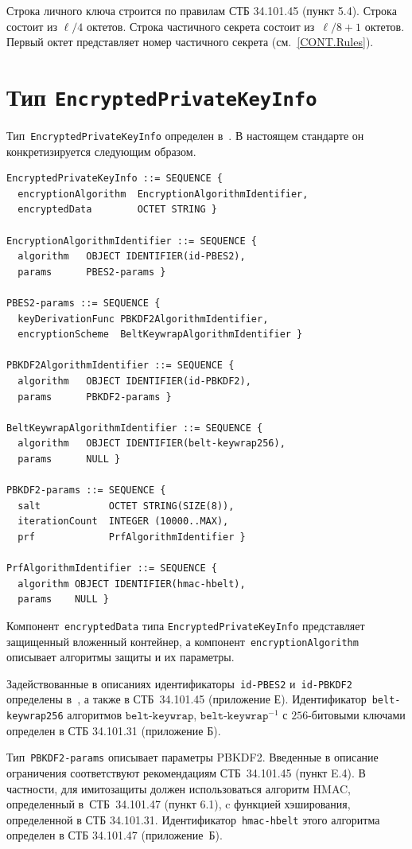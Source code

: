 Строка личного ключа строится по правилам СТБ 34.101.45 (пункт 5.4). 
Строка состоит из $\ell/4$ октетов. 
%
Строка частичного секрета состоит из~$\ell/8+1$ октетов. 
Первый октет представляет номер частичного секрета (см.~\ref{CONT.Rules}).

\section{Тип \texttt{EncryptedPrivateKeyInfo}}\label{CONT.CT}

Тип~\texttt{EncryptedPrivateKeyInfo} определен в~\cite{PKCS5}. В настоящем
стандарте он конкретизируется следующим образом.
%
\begin{verbatim}
EncryptedPrivateKeyInfo ::= SEQUENCE {
  encryptionAlgorithm  EncryptionAlgorithmIdentifier,
  encryptedData        OCTET STRING }

EncryptionAlgorithmIdentifier ::= SEQUENCE {
  algorithm   OBJECT IDENTIFIER(id-PBES2),
  params      PBES2-params }

PBES2-params ::= SEQUENCE {
  keyDerivationFunc PBKDF2AlgorithmIdentifier,
  encryptionScheme  BeltKeywrapAlgorithmIdentifier }

PBKDF2AlgorithmIdentifier ::= SEQUENCE {
  algorithm   OBJECT IDENTIFIER(id-PBKDF2),
  params      PBKDF2-params }

BeltKeywrapAlgorithmIdentifier ::= SEQUENCE {
  algorithm   OBJECT IDENTIFIER(belt-keywrap256),
  params      NULL }

PBKDF2-params ::= SEQUENCE {
  salt            OCTET STRING(SIZE(8)),
  iterationCount  INTEGER (10000..MAX),
  prf             PrfAlgorithmIdentifier }

PrfAlgorithmIdentifier ::= SEQUENCE {
  algorithm OBJECT IDENTIFIER(hmac-hbelt), 
  params    NULL }
\end{verbatim}

Компонент~\texttt{encryptedData} типа \texttt{EncryptedPrivateKeyInfo}
представляет защищенный вложенный контейнер, 
а компонент~\texttt{encryptionAlgorithm} описывает
алгоритмы защиты и их параметры. 

Задействованные в описаниях идентификаторы~\texttt{id-PBES2} 
и~\texttt{id-PBKDF2} определены в~\cite{PKCS5}, а также в СТБ~34.101.45 
(приложение Е).  
%
Идентификатор~\texttt{belt-keywrap256} алгоритмов 
$\texttt{belt-keywrap}$, $\texttt{belt-keywrap}^{-1}$
с $256$-битовыми ключами определен в СТБ 34.101.31 (приложение Б).

Тип~\texttt{PBKDF2-params} описывает параметры PBKDF2.
Введенные в описание ограничения соответствуют 
рекомендациям СТБ~34.101.45 (пункт E.4).
%
В частности, для имитозащиты должен использоваться алгоритм HMAC, 
определенный в~СТБ~34.101.47 (пункт 6.1), c функцией хэширования, 
определенной в СТБ 34.101.31. 
Идентификатор~\texttt{hmac-hbelt} этого алгоритма 
определен в СТБ 34.101.47 (приложение~Б).

